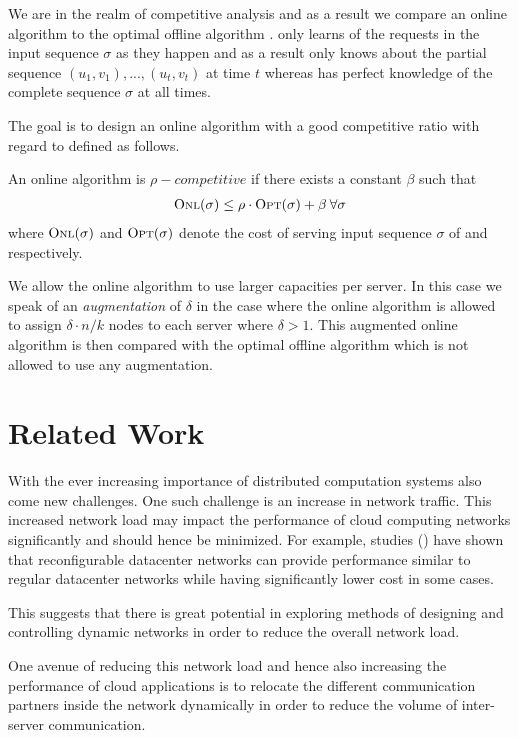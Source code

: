 \documentclass[a4paper, 10pt]{article}
\newcommand{\opt}{\text{O{\scriptsize PT}}}
\newcommand{\onl}{\text{O{\scriptsize NL}}}
\theoremstyle{definition}
\begin{document}
	We are in the realm of competitive analysis and as a result we compare an online algorithm \onl{} to the optimal offline algorithm \opt{}. \onl{} only learns of the requests in the input sequence $\sigma$ as they happen and as a result only knows about the partial sequence $(u_1,v_1),...,(u_t,v_t)$ at time $t$ whereas \opt{} has perfect knowledge of the complete sequence $\sigma$ at all times.
	
	The goal is to design an online algorithm \onl{} with a good competitive ratio with regard to \opt{} defined as follows.
	
	An online algorithm \onl{} is $\rho-competitive$ if there exists a constant $\beta$ such that 
	\begin{align*}
	\onl{}(\sigma)\leq\rho\cdot \opt{}(\sigma)+\beta\:\forall \sigma
	\end{align*} 
	where $\onl{}(\sigma)$ and $\opt{}(\sigma)$ denote the cost of serving input sequence $\sigma$ of \onl{} and \opt{} respectively.
	
	We allow the online algorithm to use larger capacities per server. In this case we speak of an \textit{augmentation} of $\delta$ in the case where the online algorithm is allowed to assign $\delta\cdot n/k$ nodes to each server where $\delta>1$. This augmented online algorithm is then compared with the optimal offline algorithm \opt{} which is not allowed to use any augmentation.
	
	\section{Related Work}
	\label{related_work_section}
	
	With the ever increasing importance of distributed computation systems also come new challenges. One such challenge is an increase in network traffic. This increased network load may impact the performance of cloud computing networks significantly and should hence be minimized. For example, studies (\cite{Ghobadi2016, Hamedazimi2014}) have shown that reconfigurable datacenter networks can provide performance similar to regular datacenter networks while having significantly lower cost in some cases.
	
	This suggests that there is great potential in exploring methods of designing and controlling dynamic networks in order to reduce the overall network load.
	
	One avenue of reducing this network load and hence also increasing the performance of cloud applications is to relocate the different communication partners inside the network dynamically in order to reduce the volume of inter-server communication.
	
\end{document}
